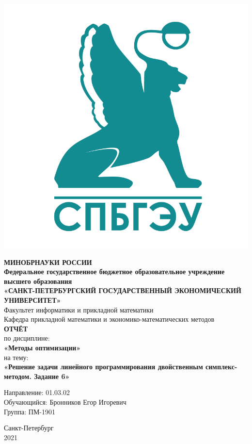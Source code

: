 \documentclass[14pt,a4paper,fleqn]{extarticle}
\begin{document}
	\begin{titlepage}
		\includegraphics[scale=0.12]{logo}
		\begin{center}
			\textbf{МИНОБРНАУКИ РОССИИ}\\
			\vspace{0.2cm}
			\textbf{Федеральное государственное бюджетное образовательное учреждение высшего образования}\\
			\textbf{«САНКТ-ПЕТЕРБУРГСКИЙ ГОСУДАРСТВЕННЫЙ ЭКОНОМИЧЕСКИЙ УНИВЕРСИТЕТ»}\\
			\vspace{0.6cm}
			Факультет информатики и прикладной математики\\
			Кафедра прикладной математики и экономико-математических методов\\
			\vspace{1cm}
			\textbf{ОТЧЁТ}\\
			по дисциплине:\\
			\textbf{«Методы оптимизации»}\\
			на тему:\\
			\textbf{«Решение задачи линейного программирования двойственным симплекс-методом. Задание 6»}\\
		\end{center}
		\vspace{1cm}
		Направление: 01.03.02\\
		Обучающийся: Бронников Егор Игоревич\\
		Группа: ПМ-1901\\
		\vfill
		\begin{center}
			Санкт-Петербург\\
			2021\\
		\end{center}
	\end{titlepage}
\end{document}
